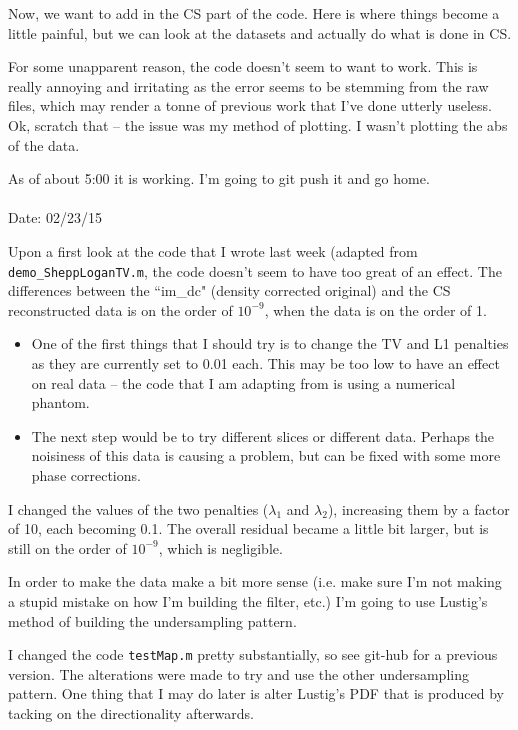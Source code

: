 \documentclass[11 pt]{article}
\begin{document}
        Now, we want to add in the CS part of the code. Here is where things become a little painful, but we can look at the datasets and actually do what is done in CS.

        For some unapparent reason, the code doesn't seem to want to work. This is really annoying and irritating as the error seems to be stemming from the raw files, which may render a tonne of previous work that I've done utterly useless. Ok, scratch that -- the issue was my method of plotting. I wasn't plotting the abs of the data. 

        As of about 5:00 it is working. I'm going to git push it and go home. \\ \\

        \noindent Date: 02/23/15

       Upon a first look at the code that I wrote last week (adapted from \verb!demo_SheppLoganTV.m!, the code doesn't seem to have too great of an effect. The differences between the ``im\_dc" (density corrected original) and the CS reconstructed data is on the order of $10^{-9}$, when the data is on the order of 1.

        \begin{itemize}
          \item One of the first things that I should try is to change the TV and L1 penalties as they are currently set to 0.01 each. This may be too low to have an effect on real data -- the code that I am adapting from is using a numerical phantom.
          \item The next step would be to try different slices or different data. Perhaps the noisiness of this data is causing a problem, but can be fixed with some more phase corrections.
        \end{itemize}

        I changed the values of the two penalties ($\lambda_1$ and $\lambda_2$), increasing them by a factor of 10, each becoming 0.1. The overall residual became a little bit larger, but is still on the order of $10^{-9}$, which is negligible.

        In order to make the data make a bit more sense (i.e. make sure I'm not making a stupid mistake on how I'm building the filter, etc.) I'm going to use Lustig's method of building the undersampling pattern.

        I changed the code \verb!testMap.m! pretty substantially, so see git-hub for a previous version. The alterations were made to try and use the other undersampling pattern. One thing that I may do later is alter Lustig's PDF that is produced by tacking on the directionality afterwards.
\end{document}
